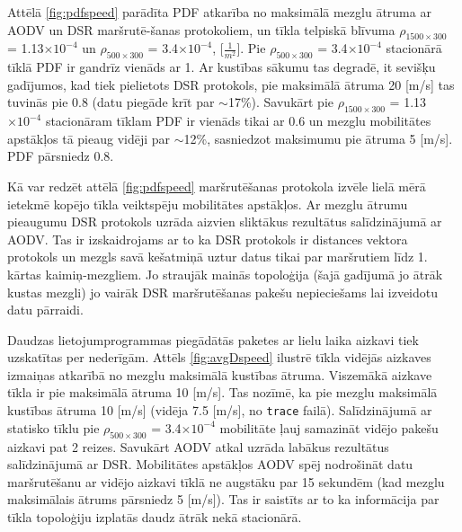 Attēlā \ref{fig:pdfspeed} parādīta PDF atkarība no maksimālā mezglu ātruma ar AODV un DSR maršrutē-šanas protokoliem, un tīkla telpiskā blīvuma $\rho_{1500\times300}$ = 1.13$\times10^{-4}$ un $\rho_{500\times300}$ = 3.4$\times10^{-4}$, [$\frac{1}{m^{2}}$]. Pie $\rho_{500\times300}$ = 3.4$\times10^{-4}$ stacionārā tīklā PDF ir gandrīz vienāds ar 1. Ar kustības sākumu tas degradē, it sevišķu gadījumos, kad tiek pielietots DSR protokols, pie maksimālā ātruma 20 [m/s] tas tuvinās pie 0.8 (datu piegāde krīt par $\sim$17\%). Savukārt pie $\rho_{1500\times300}$ = 1.13$\times10^{-4}$ stacionāram tīklam PDF ir vienāds tikai ar 0.6 un mezglu mobilitātes apstākļos tā pieaug vidēji par $\sim$12\%, sasniedzot maksimumu pie ātruma 5 [m/s]. PDF pārsniedz 0.8.

Kā var redzēt attēlā \ref{fig:pdfspeed} maršrutēšanas protokola izvēle lielā mērā ietekmē kopējo tīkla veiktspēju mobilitātes apstākļos. Ar mezglu ātrumu pieaugumu DSR protokols uzrāda aizvien sliktākus rezultātus salīdzinājumā ar AODV. Tas ir izskaidrojams ar to ka DSR protokols ir distances vektora protokols un mezgls savā kešatmiņā uztur datus tikai par maršrutiem līdz 1. kārtas kaimiņ-mezgliem. Jo straujāk mainās topoloģija (šajā gadījumā jo ātrāk kustas mezgli) jo vairāk DSR maršrutēšanas pakešu nepieciešams lai izveidotu datu pārraidi.

Daudzas lietojumprogrammas piegādātās paketes ar lielu laika aizkavi tiek uzskatītas per nederīgām. Attēls \ref{fig:avgDspeed} ilustrē tīkla vidējās aizkaves izmaiņas atkarībā no mezglu maksimālā kustības ātruma. Viszemākā aizkave tīkla ir pie maksimālā ātruma 10 [m/s]. Tas nozīmē, ka pie mezglu maksimālā kustības ātruma 10 [m/s] (vidēja 7.5 [m/s], no \texttt{trace} failā). Salīdzinājumā ar statisko tīklu pie $\rho_{500\times300}$ = 3.4$\times10^{-4}$ mobilitāte ļauj samazināt vidējo pakešu aizkavi pat 2 reizes. Savukārt AODV atkal uzrāda labākus rezultātus salīdzinājumā ar DSR. Mobilitātes apstākļos AODV spēj nodrošināt datu maršrutēšanu ar vidējo aizkavi tīklā ne augstāku par 15 sekundēm (kad mezglu maksimālais ātrums pārsniedz 5 [m/s]). Tas ir saistīts ar to ka informācija par tīkla topoloģiju izplatās daudz ātrāk nekā stacionārā.

